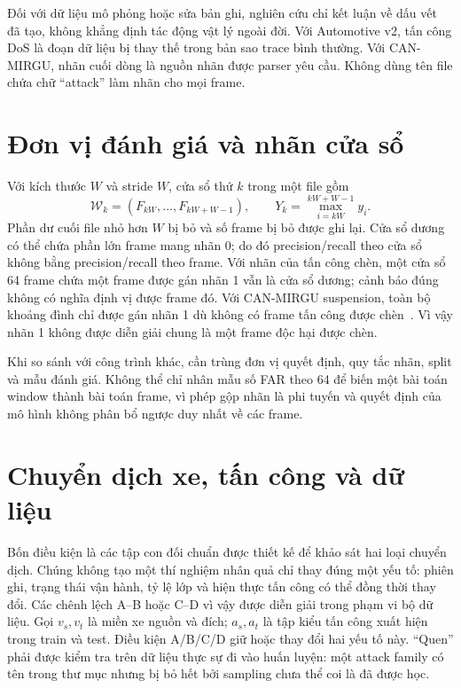 \documentclass[12pt,a4paper,oneside,openany]{extbook}
\begin{document}
Đối với dữ liệu mô phỏng hoặc sửa bản ghi, nghiên cứu chỉ kết luận về dấu vết đã tạo, không khẳng định tác động vật lý ngoài đời. Với Automotive v2, tấn công DoS là đoạn dữ liệu bị thay thế trong bản sao trace bình thường. Với CAN-MIRGU, nhãn cuối dòng là nguồn nhãn được parser yêu cầu. Không dùng tên file chứa chữ ``attack'' làm nhãn cho mọi frame.

\section{Đơn vị đánh giá và nhãn cửa sổ}
Với kích thước $W$ và stride $W$, cửa sổ thứ $k$ trong một file gồm
\begin{equation}
\mathcal{W}_k=(F_{kW},\ldots,F_{kW+W-1}),\qquad Y_k=\max_{i=kW}^{kW+W-1}y_i.
\end{equation}
Phần dư cuối file nhỏ hơn $W$ bị bỏ và số frame bị bỏ được ghi lại. Cửa sổ dương có thể chứa phần lớn frame mang nhãn 0; do đó precision/recall theo cửa sổ không bằng precision/recall theo frame. Với nhãn của tấn công chèn, một cửa sổ 64 frame chứa một frame được gán nhãn 1 vẫn là cửa sổ dương; cảnh báo đúng không có nghĩa định vị được frame đó. Với CAN-MIRGU suspension, toàn bộ khoảng đình chỉ được gán nhãn 1 dù không có frame tấn công được chèn~\cite{rajapaksha2024canmirgu}. Vì vậy nhãn 1 không được diễn giải chung là một frame độc hại được chèn.

Khi so sánh với công trình khác, cần trùng đơn vị quyết định, quy tắc nhãn, split và mẫu đánh giá. Không thể chỉ nhân mẫu số FAR theo 64 để biến một bài toán window thành bài toán frame, vì phép gộp nhãn là phi tuyến và quyết định của mô hình không phân bổ ngược duy nhất về các frame.

\section{Chuyển dịch xe, tấn công và dữ liệu}

Bốn điều kiện là các tập con đối chuẩn được thiết kế để khảo sát hai loại chuyển dịch. Chúng không tạo một thí nghiệm nhân quả chỉ thay đúng một yếu tố: phiên ghi, trạng thái vận hành, tỷ lệ lớp và hiện thực tấn công có thể đồng thời thay đổi. Các chênh lệch A--B hoặc C--D vì vậy được diễn giải trong phạm vi bộ dữ liệu.
Gọi $v_s,v_t$ là miền xe nguồn và đích; $a_s,a_t$ là tập kiểu tấn công xuất hiện trong train và test. Điều kiện A/B/C/D giữ hoặc thay đổi hai yếu tố này. ``Quen'' phải được kiểm tra trên dữ liệu thực sự đi vào huấn luyện: một attack family có tên trong thư mục nhưng bị bỏ hết bởi sampling chưa thể coi là đã được học.
\end{document}
